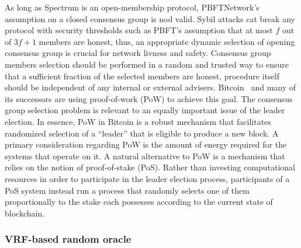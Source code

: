 As long as Spectrum is an open-membership protocol, PBFTNetwork's assumption on a closed consensus group is nod valid.
Sybil attacks cat break any protocol with security thresholds such as PBFT's assumption that at most $f$ out of ${3 f + 1}$ members are honest, thus, an appropriate dynamic selection of opening consensus group is crucial for network livness and safety.
Consensus group members selection should be performed in a random and trusted way to ensure that a sufficient fraction of the selected members are honest, procedure itself should be independent of any internal or external advisers.
Bitcoin~\cite{nakamoto2009bitcoin} and many of its successors are using proof-of-work (PoW) to achieve this goal.
The consensus group selection problem is relevant to an equally important issue of the leader election.
In essence, PoW in Bitcoin is a robust mechanism that facilitates randomized selection of a \enquote{leader} that is eligible to produce a new block.
A primary consideration regarding PoW is the amount of energy required for the systems that operate on it.
A natural alternative to PoW is a mechanism that relies on the notion of proof-of-stake (PoS).
Rather than investing computational resources in order to participate in the leader election process, participants of a PoS system instead run a process that randomly selects one of them proportionally to the stake each possesses according to the current state of blockchain.

\subsubsection{VRF-based random oracle}

